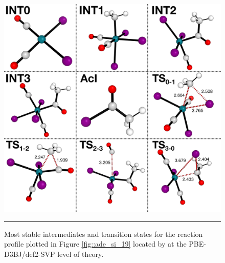\documentclass[../../main.tex]{subfiles}
\begin{document}
\begin{figure}[h!]
	\vspace{0.4cm}
	\centering
	\includegraphics[width=13cm]{5/autode/figs/figS20}
	\vspace{0.2cm}
	\hrule
	\caption{Most stable intermediates and transition states for the reaction profile plotted in Figure \ref{fig::ade_si_19} located by \ade at the PBE-D3BJ/def2-SVP level of theory.}
	\label{fig::ade_si_20}
\end{figure}
\end{document}
